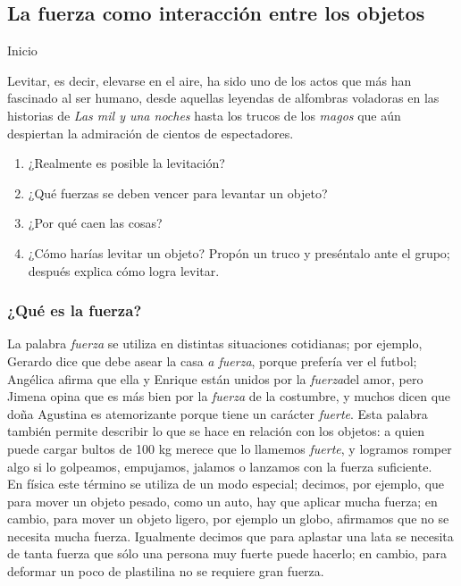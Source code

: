 \documentclass[11pt]{book}
\begin{document}
\subsection{La fuerza como interacci\'on entre los objetos}
\begin{boxF}
  \begin{center}\color{colorrds}Inicio\end{center}
  Levitar, es decir, elevarse en el aire, ha sido uno de los actos que más han fascinado
  al ser humano, desde aquellas leyendas de alfombras voladoras en las historias de
  \emph{Las mil y una noches} hasta los trucos de los \emph{magos} que aún despiertan la
  admiración de cientos de espectadores.
  \begin{enumerate}
    \item ¿Realmente es posible la levitación?
    \item ¿Qué fuerzas se deben vencer para levantar un objeto?
    \item ¿Por qué caen las cosas?
    \item ¿Cómo harías levitar un objeto? Propón un truco y preséntalo ante el grupo;
          después explica cómo logra levitar.
  \end{enumerate}
\end{boxF}
\subsubsection{¿Qué es la fuerza?}
La palabra \emph{fuerza} se utiliza en distintas situaciones cotidianas; por ejemplo,
Gerardo dice que debe asear la casa \emph{a fuerza}, porque prefería ver el futbol;
Angélica afirma que ella y Enrique están unidos por la \emph{fuerza}del amor, pero
Jimena opina que es más bien por la \emph{fuerza} de la costumbre, y muchos dicen que doña Agustina
es atemorizante porque tiene un carácter \emph{fuerte}. Esta palabra también permite describir
lo que se hace en relación con los objetos: a quien puede cargar bultos de 100 kg merece
que lo llamemos \emph{fuerte}, y logramos romper algo si lo golpeamos, empujamos, jalamos o
lanzamos con la fuerza suficiente. \\

En física este término se utiliza de un modo especial;
decimos, por ejemplo, que para mover un objeto pesado, como un auto, hay que aplicar mucha
fuerza; en cambio, para mover un objeto ligero, por ejemplo un globo, afirmamos que no se
necesita mucha fuerza. Igualmente decimos que para aplastar una lata se necesita de tanta
fuerza que sólo una persona muy fuerte puede hacerlo; en cambio, para deformar un poco de
plastilina no se requiere gran fuerza.\\
\end{document}
